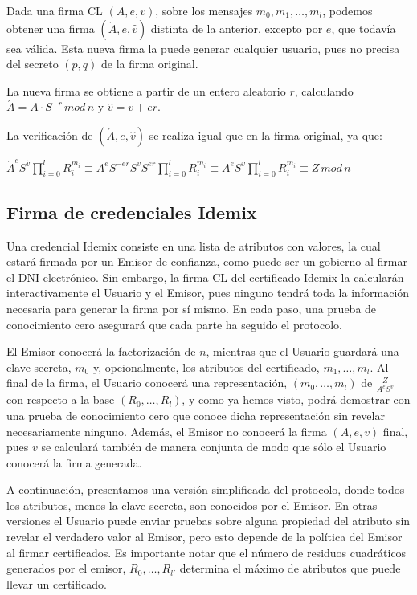 Dada una firma CL $(A,e,v)$, sobre los mensajes  $m_0,m_1,\dots,m_l$, podemos obtener una firma $(\acute{A},e,\hat{v})$ distinta de la anterior, excepto por $e$, que todavía sea válida. Esta nueva firma la puede generar cualquier usuario, pues no precisa del secreto $(p,q)$ de la firma original.

La nueva firma se obtiene a partir de un entero aleatorio $r$, calculando $\acute{A}= A\cdot S^{-r}\, mod\, n$ y $\hat{v}=v+er$.

La verificación de $(\acute{A},e,\hat{v})$ se realiza igual que en la firma original, ya que:

\begin{center}
	$
	\acute{A}^e S^{\hat{v}} \prod_{i=0}^{l} R_i^{m_i} \equiv A^e S^{-er} S^v S^{er} \prod_{i=0}^{l} R_i^{m_i} \equiv A^e S^v \prod_{i=0}^{l} R_i^{m_i} \equiv Z \, mod \, n
	$
\end{center}


\subsection{Firma de credenciales Idemix}\label{idemix:cert}

Una credencial Idemix consiste en una lista de atributos con valores, la cual estará firmada por un Emisor de confianza, como puede ser un gobierno al firmar el DNI electrónico. Sin embargo, la firma CL del certificado Idemix la calcularán interactivamente el Usuario y el Emisor, pues ninguno tendrá toda la información necesaria para generar la firma por sí mismo. En cada paso, una prueba de conocimiento cero asegurará que cada parte ha seguido el protocolo.

El Emisor conocerá la factorización de $n$, mientras que el Usuario guardará una clave secreta, $m_0$ y, opcionalmente, los atributos del certificado, $m_1,\dots,m_l$. Al final de la firma, el Usuario conocerá una representación, $(m_0,\dots,m_l)$ de $\frac{Z}{A^eS^v}$ con respecto a la base $(R_0,\dots,R_l)$, y como ya hemos visto, podrá demostrar con una prueba de conocimiento cero que conoce dicha representación sin revelar necesariamente ninguno. Además, el Emisor no conocerá la firma $(A,e,v)$ final, pues $v$ se calculará también de manera conjunta de modo que sólo el Usuario conocerá la firma generada.

\hfil

A continuación, presentamos una versión simplificada del protocolo, donde todos los atributos, menos la clave secreta, son conocidos por el Emisor. En otras versiones el Usuario puede enviar pruebas sobre alguna propiedad del atributo sin revelar el verdadero valor al Emisor, pero esto depende de la política del Emisor al firmar certificados. Es importante notar que el número de residuos cuadráticos generados por el emisor, $R_0,\dots,R_{l'}$ determina el máximo de atributos que puede llevar un certificado.

